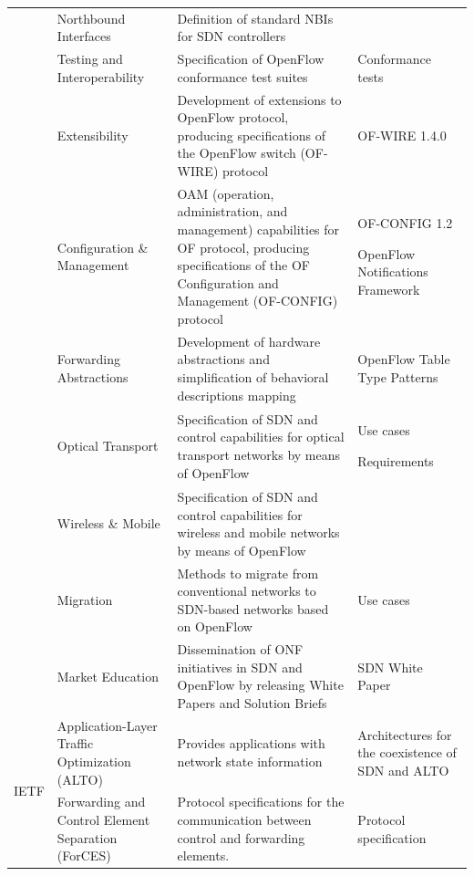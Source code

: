 {{\begin{table}[!htp]
\begin{center}
\begin{tabularx}{\linewidth}{p{0.8cm}p{3.8cm}Xp{4.6cm}}
& Northbound Interfaces & Definition of standard NBIs for SDN controllers	& \\\cline{2-4}

& Testing and Interoperability	& Specification of OpenFlow conformance test suites	& Conformance tests~\cite{CTSOSS} \\\cline{2-4}

& Extensibility	& Development of extensions to OpenFlow protocol, producing specifications of the OpenFlow switch (OF-WIRE) protocol &	OF-WIRE 1.4.0~\cite{OSS} \\\cline{2-4}

& Configuration \& Management	& OAM (operation, administration, and management) capabilities for OF protocol, producing specifications of the OF Configuration and Management (OF-CONFIG) protocol & OF-CONFIG 1.2~\cite{OFCONFIG} \par OpenFlow Notifications Framework~\cite{onf2013-2} \\\cline{2-4}

& Forwarding Abstractions & Development of hardware abstractions and simplification of behavioral descriptions mapping & OpenFlow Table Type Patterns~\cite{OTTP} \\\cline{2-4}

& Optical Transport	& Specification of SDN and control capabilities for optical transport networks by means of OpenFlow & Use cases~\cite{OTUC} \par Requirements~\cite{RATOSDN} \\\cline{2-4}

& Wireless \& Mobile & Specification of SDN and control capabilities for wireless and mobile networks by means of OpenFlow & \\\cline{2-4}

& Migration	& Methods to migrate from conventional networks to SDN-based networks based on OpenFlow & Use cases~\cite{MUCM} \\\cline{2-4}

& Market Education	& Dissemination of ONF initiatives in SDN and OpenFlow by releasing White Papers and Solution Briefs	& SDN White Paper~\cite{SDN_NNN} \\
\hline
\multirow{15}{*}{IETF} 
& Application-Layer Traffic Optimization (ALTO) &  Provides applications with network state information  &    Architectures for the coexistence of SDN and ALTO~\cite{xie2012} \\\cline{2-4}

& Forwarding and Control Element Separation (ForCES) & Protocol specifications for the communication between control and forwarding elements. & Protocol specification~\cite{doria2010} \\\cline{2-4}


\end{tabularx}
\end{center}
\end{table}}}

